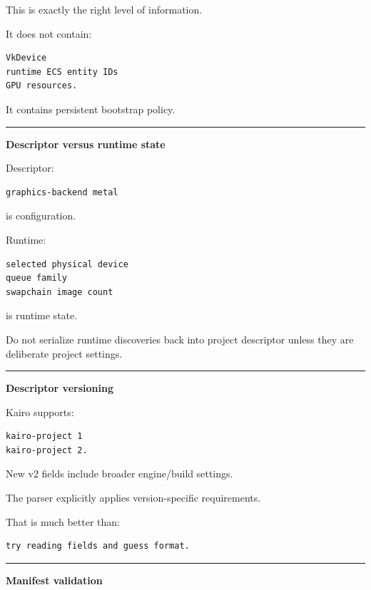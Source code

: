 This is exactly the right level of information.

It does not contain:

\begin{verbatim}
VkDevice
runtime ECS entity IDs
GPU resources.
\end{verbatim}

It contains persistent bootstrap policy.

\begin{center}\rule{0.5\linewidth}{0.5pt}\end{center}

\textbf{Descriptor versus runtime state}

Descriptor:

\begin{verbatim}
graphics-backend metal
\end{verbatim}

is configuration.

Runtime:

\begin{verbatim}
selected physical device
queue family
swapchain image count
\end{verbatim}

is runtime state.

Do not serialize runtime discoveries back into project descriptor unless they are deliberate project settings.

\begin{center}\rule{0.5\linewidth}{0.5pt}\end{center}

\textbf{Descriptor versioning}

Kairo supports:

\begin{verbatim}
kairo-project 1
kairo-project 2.
\end{verbatim}

New v2 fields include broader engine/build settings.

The parser explicitly applies version-specific requirements.

That is much better than:

\begin{verbatim}
try reading fields and guess format.
\end{verbatim}

\begin{center}\rule{0.5\linewidth}{0.5pt}\end{center}

\textbf{Manifest validation}

